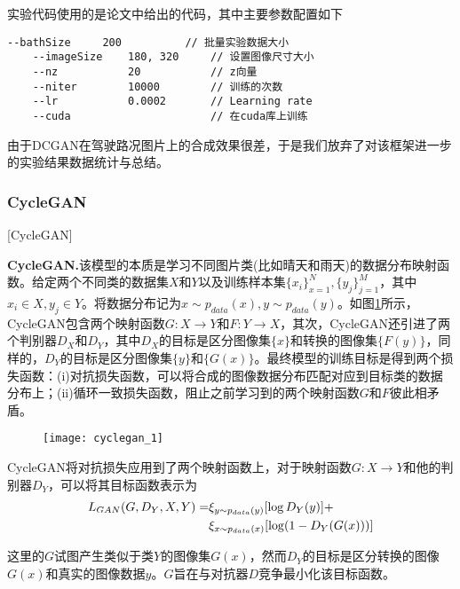 实验代码使用的是\cite{dcgan}论文中给出的代码，其中主要参数配置如下

\begin{lstlisting}[basicstyle=\small]
    --bathSize     200          // 批量实验数据大小
    --imageSize    180, 320     // 设置图像尺寸大小
    --nz           20           // z向量
    --niter        10000        // 训练的次数
    --lr           0.0002       // Learning rate
    --cuda                      // 在cuda库上训练
\end{lstlisting}

由于DCGAN在驾驶路况图片上的合成效果很差，于是我们放弃了对该框架进一步的实验结果数据统计与总结。


\subsubsection{CycleGAN}[CycleGAN]

\textbf{CycleGAN.}\cite{CycleGAN}\quad 该模型的本质是学习不同图片类(比如晴天和雨天)的数据分布映射函数。给定两个不同类的数据集$X$和$Y$以及训练样本集$\{x_i\}_{x=1}^N, \{y_j\}_{j=1}^M$，其中$x_i\in X, y_j\in Y$。将数据分布记为$x\sim p_{data}(x), y\sim p_{data}(y)$。如图\ref{cyclegan_1}所示，CycleGAN包含两个映射函数$G: X\to Y$和$F: Y\to X$，其次，CycleGAN还引进了两个判别器$D_X$和$D_Y$，其中$D_X$的目标是区分图像集$\{x\}$和转换的图像集$\{F(y)\}$，同样的，$D_Y$的目标是区分图像集$\{y\}$和$\{G(x)\}$。最终模型的训练目标是得到两个损失函数：(i)对抗损失函数，可以将合成的图像数据分布匹配对应到目标类的数据分布上；(ii)循环一致损失函数，阻止之前学习到的两个映射函数$G$和$F$彼此相矛盾。

\begin{figure}[h]
    \centering
    \texttt{[image: cyclegan\_1]}
    \label{cyclegan_1}
    \caption{}
\end{figure}

CycleGAN将对抗损失应用到了两个映射函数上，对于映射函数$G:X\to Y$和他的判别器$D_Y$，可以将其目标函数表示为
\begin{align*}
    \label{eq:2}
    \centering
    L_{GAN}(G,D_Y,X,Y)= & \xi_{y\sim p_{data}(y)}[\log D_Y(y)] + \\
    & \xi_{x\sim p_{data}(x)}[\log (1-D_Y(G(x)))]
\end{align*}

这里的$G$试图产生类似于类$Y$的图像集$G(x)$，然而$D_Y$的目标是区分转换的图像$G(x)$和真实的图像数据$y$。$G$旨在与对抗器$D$竞争最小化该目标函数。

